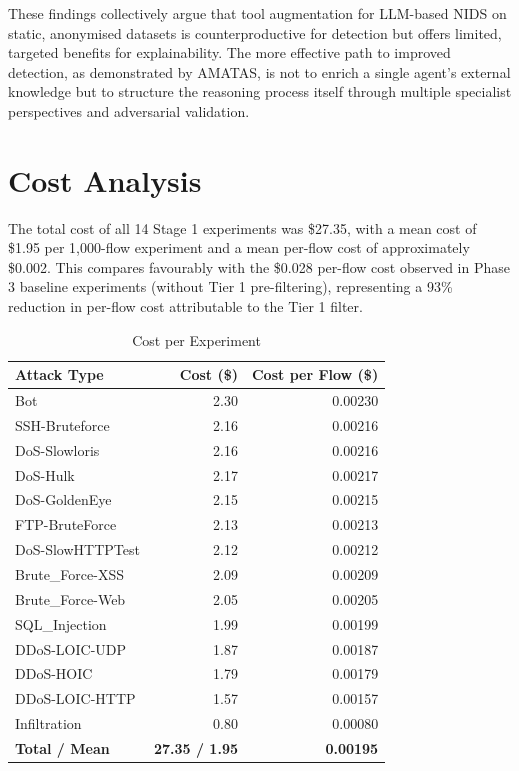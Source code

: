 \documentclass[../main.tex]{subfiles}
\begin{document}
These findings collectively argue that tool augmentation for LLM-based NIDS on static, anonymised datasets is counterproductive for detection but offers limited, targeted benefits for explainability. The more effective path to improved detection, as demonstrated by AMATAS, is not to enrich a single agent's external knowledge but to structure the reasoning process itself through multiple specialist perspectives and adversarial validation.

\section{Cost Analysis}
\label{sec:cost-analysis}

The total cost of all 14 Stage 1 experiments was \$27.35, with a mean cost of \$1.95 per 1,000-flow experiment and a mean per-flow cost of approximately \$0.002. This compares favourably with the \$0.028 per-flow cost observed in Phase 3 baseline experiments (without Tier 1 pre-filtering), representing a 93\% reduction in per-flow cost attributable to the Tier 1 filter.

\begin{table}[H]
\centering
\caption{Cost per Experiment}
\label{tab:cost-per-experiment}
\begin{tabular}{l r r}
\toprule
Attack Type & Cost (\$) & Cost per Flow (\$) \\
\midrule
Bot & 2.30 & 0.00230 \\
SSH-Bruteforce & 2.16 & 0.00216 \\
DoS-Slowloris & 2.16 & 0.00216 \\
DoS-Hulk & 2.17 & 0.00217 \\
DoS-GoldenEye & 2.15 & 0.00215 \\
FTP-BruteForce & 2.13 & 0.00213 \\
DoS-SlowHTTPTest & 2.12 & 0.00212 \\
Brute\_Force-XSS & 2.09 & 0.00209 \\
Brute\_Force-Web & 2.05 & 0.00205 \\
SQL\_Injection & 1.99 & 0.00199 \\
DDoS-LOIC-UDP & 1.87 & 0.00187 \\
DDoS-HOIC & 1.79 & 0.00179 \\
DDoS-LOIC-HTTP & 1.57 & 0.00157 \\
Infiltration & 0.80 & 0.00080 \\
\midrule
\textbf{Total / Mean} & \textbf{27.35 / 1.95} & \textbf{0.00195} \\
\bottomrule
\end{tabular}
\end{table}
\end{document}
